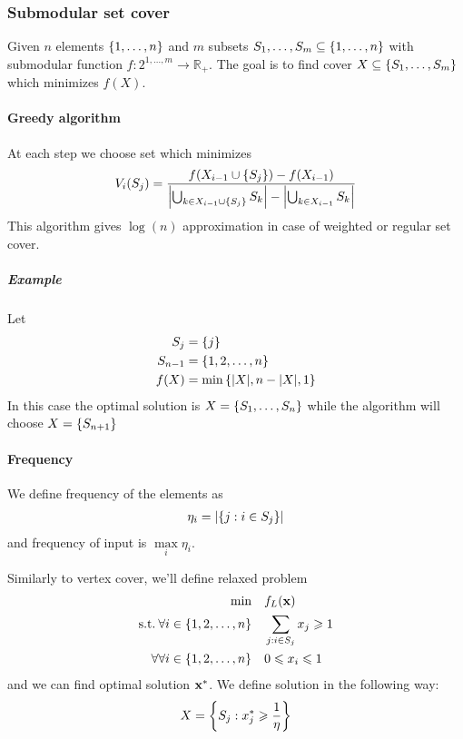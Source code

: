 \subsubsection{Submodular set cover }
Given $n$ elements $\qty{1,\dots, n}$ and $m$ subsets $S_1,\dots, S_m \subseteq \qty{1, \dots, n}$ with submodular function $f: 2^{1,\dots, m} \to \mathbb{R}_+$. The goal is to find cover $X\subseteq \qty{S_1, \dots, S_m}$ which minimizes $f(X)$.


\paragraph{Greedy algorithm}
At each step we choose set which minimizes
\begin{align}
V_i(S_j) = \frac{f\qty(X_{i-1} \cup \qty{S_j})-f\qty(X_{i-1} )}{\abs{\bigcup_{k\in X_{i-1}\cup \qty{S_j}} S_k} - \abs{\bigcup_{k\in X_{i-1}} S_k }}
\end{align}
This algorithm gives $\log(n)$ approximation in case of weighted or regular set cover.

\subparagraph{Example}
Let 
\begin{align}
S_j &= \qty{j}\\
S_{n-1} &= \qty{1,2,\dots, n}\\
f(X) &= \min \qty{ \abs{X}, n-\abs{X}, 1}
\end{align}
In this case the optimal solution is $X = \qty{S_1, \dots, S_n}$ while the algorithm will choose $X = \qty{S_{n+1}}$
\paragraph{Frequency}
We define frequency of the elements as 
\begin{align}
\eta_i = \abs{\qty{j: i \in S_j}}
\end{align}
and frequency of input is $\max\limits_i \eta_i$.

Similarly to vertex cover, we'll define relaxed problem
\begin{align} \label{eq:ssp_relax}
\min \quad&  f_L(\vb{x}) \\ 
\text{s.t.} \: \forall i \in \qty{1,2,\dots, n} \quad&\sum_{j: i\in S_j} x_j \geqslant 1 \\
\forall \forall i \in \qty{1,2,\dots, n} \quad&0\leqslant x_i \leqslant 1 
\end{align}
 and we can find optimal solution $\vb{x}^*$. We define solution in the following way:
 \begin{align}
 X = \qty{S_j: x_j^* \geqslant \frac{1}{\eta}}
 \end{align}
 
